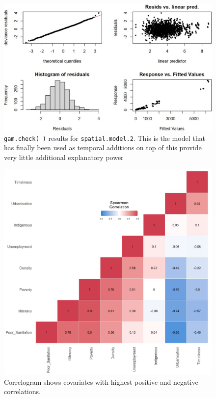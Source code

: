 \begin{figure}[H]
\centering
\includegraphics[scale=0.5]{spatial_model_2_check.jpg}
\caption{\label{fig:spatial_model_2_check}\texttt{gam.check( )} results for \texttt{spatial.model.2}. This is the model that has finally been used as temporal additions on top of this provide very little additional explanatory power}
\end{figure}



\begin{figure}[H]
\centering
\includegraphics[scale=0.4]{spearman_correl.jpg}
\caption{\label{fig:spearman_correl}Correlogram shows covariates with highest positive and negative correlations.}
\end{figure}


